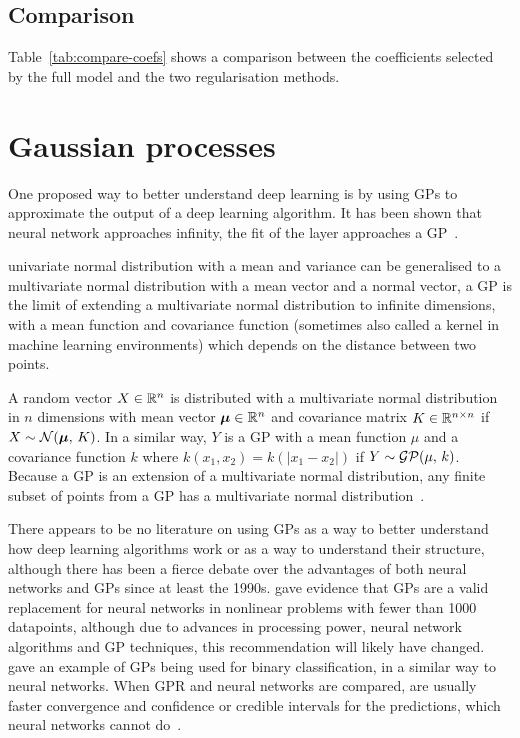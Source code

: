 
\subsection{Comparison}

Table~\ref{tab:compare-coefs} shows a comparison between the coefficients selected by the full model and the two regularisation methods.


\section{Gaussian processes}

One proposed way to better understand deep learning is by using \acp{GP} to approximate the output of a deep learning algorithm.
It has been shown that  neural network approaches infinity, the fit of the layer approaches a \ac{GP}~\autocite{neal1996}.

 univariate normal distribution with a mean and variance can be generalised to a multivariate normal distribution with a mean vector and a normal vector, a \ac{GP} is the limit of extending a multivariate normal distribution to infinite dimensions, with a mean function and covariance function (sometimes also called a kernel in machine learning environments) which depends on the distance between two points.

A random vector \(X \in \mathbb{R}{}^n\) is distributed with a multivariate normal distribution in \(n\) dimensions with mean vector \(\bm{\mu} \in \mathbb{R}{}^n\) and covariance matrix \(K \in \mathbb{R}^{n \times n}\) if \(X \sim \mathcal{N}(\bm{\mu},\, K)\).
In a similar way, \(Y\) is a \ac{GP} with a mean function \(\mu\) and a covariance function \(k\) where \(k(x_1, x_2) = k(\left|x_1 - x_2\right|)\) if \(Y \sim \mathcal{GP}(\mu,\, k)\).
Because a \ac{GP} is an extension of a multivariate normal distribution, any finite subset of points from a \ac{GP} has a multivariate normal distribution~\autocite[515]{williams1996}.

There appears to be no literature on using \acp{GP} as a way to better understand how deep learning algorithms work or as a way to understand their structure, although there has been a fierce debate over the advantages of both neural networks and \acp{GP} since at least the 1990s.
\textcite[65--66]{rasmussen1997} gave evidence that \acp{GP} are a valid replacement for neural networks in nonlinear problems with fewer than 1000 datapoints, although due to advances in processing power, neural network algorithms and \ac{GP} techniques, this recommendation will likely have changed.
\textcite[25]{mackay1997} gave an example of \acp{GP} being used for binary classification, in a similar way to neural networks.
When \ac{GPR} and neural networks are compared,  are usually faster convergence and confidence or credible intervals for the predictions, which neural networks cannot do~\autocite{herbrich2003}.


